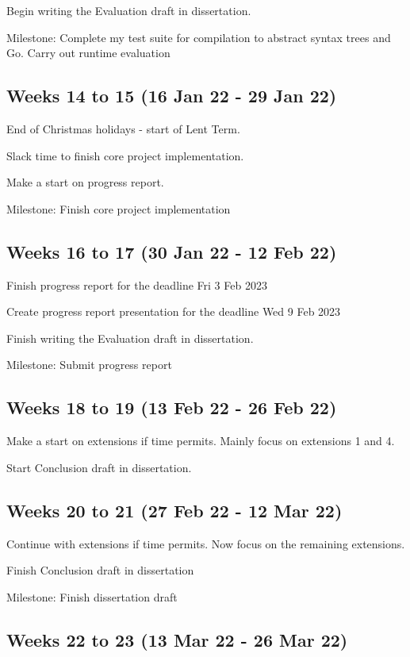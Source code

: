 \documentclass[12pt,a4paper,twoside,openright]{report}
\begin{document}
Begin writing the Evaluation draft in dissertation.

Milestone: Complete my test suite for compilation to abstract syntax trees and Go. Carry out runtime evaluation 

\subsection*{Weeks 14 to 15 (16 Jan 22 - 29 Jan 22)}
End of Christmas holidays - start of Lent Term.

Slack time to finish core project implementation.

Make a start on progress report.

Milestone: Finish core project implementation 

\subsection*{Weeks 16 to 17 (30 Jan 22 - 12 Feb 22)}

Finish progress report for the deadline Fri 3 Feb 2023

Create progress report presentation for the deadline Wed 9 Feb 2023

Finish writing the Evaluation draft in dissertation.

Milestone: Submit progress report 

\subsection*{Weeks 18 to 19 (13 Feb 22 - 26 Feb 22)}

Make a start on extensions if time permits. Mainly focus on extensions 1 and 4.

Start Conclusion draft in dissertation.

\subsection*{Weeks 20 to 21 (27 Feb 22 - 12 Mar 22)}

Continue with extensions if time permits. Now focus on the remaining extensions.

Finish Conclusion draft in dissertation

Milestone: Finish dissertation draft

\subsection*{Weeks 22 to 23 (13 Mar 22 - 26 Mar 22)}
 
\end{document}
